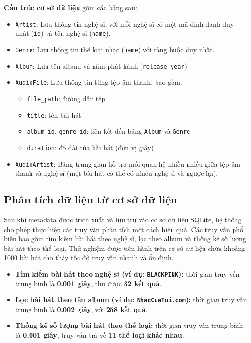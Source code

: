\documentclass[conference]{IEEEtran}
\begin{document}
\textbf{Cấu trúc cơ sở dữ liệu} gồm các bảng sau:
\begin{itemize}
  \item \texttt{Artist}: Lưu thông tin nghệ sĩ, với mỗi nghệ sĩ có một mã định danh duy nhất (\texttt{id}) và tên nghệ sĩ (\texttt{name}).
  \item \texttt{Genre}: Lưu thông tin thể loại nhạc (\texttt{name}) với ràng buộc duy nhất.
  \item \texttt{Album}: Lưu tên album và năm phát hành (\texttt{release\_year}).
  \item \texttt{AudioFile}: Lưu thông tin từng tệp âm thanh, bao gồm:
  \begin{itemize}
    \item \texttt{file\_path}: đường dẫn tệp
    \item \texttt{title}: tên bài hát
    \item \texttt{album\_id}, \texttt{genre\_id}: liên kết đến bảng \texttt{Album} và \texttt{Genre}
    \item \texttt{duration}: độ dài của bài hát (đơn vị giây)
  \end{itemize}
  \item \texttt{AudioArtist}: Bảng trung gian hỗ trợ mối quan hệ nhiều-nhiều giữa tệp âm thanh và nghệ sĩ (một bài hát có thể có nhiều nghệ sĩ và ngược lại).
\end{itemize}


\subsection{Phân tích dữ liệu từ cơ sở dữ liệu}

Sau khi metadata được trích xuất và lưu trữ vào cơ sở dữ liệu SQLite, hệ thống cho phép thực hiện các truy vấn phân tích một cách hiệu quả. Các truy vấn phổ biến bao gồm tìm kiếm bài hát theo nghệ sĩ, lọc theo album và thống kê số lượng bài hát theo thể loại. Thử nghiệm được tiến hành trên cơ sở dữ liệu chứa khoảng 1000 bài hát cho thấy tốc độ truy vấn nhanh và ổn định.

\begin{itemize}
    \item \textbf{Tìm kiếm bài hát theo nghệ sĩ (ví dụ: \texttt{BLACKPINK}):} thời gian truy vấn trung bình là \textbf{0.001 giây}, thu được \textbf{32 kết quả}.
    \item \textbf{Lọc bài hát theo tên album (ví dụ: \texttt{NhacCuaTui.com}):} thời gian truy vấn trung bình là \textbf{0.002 giây}, với \textbf{258 kết quả}.
    \item \textbf{Thống kê số lượng bài hát theo thể loại:} thời gian truy vấn trung bình là \textbf{0.001 giây}, truy vấn trả về \textbf{11 thể loại khác nhau}.
\end{itemize}
\end{document}
